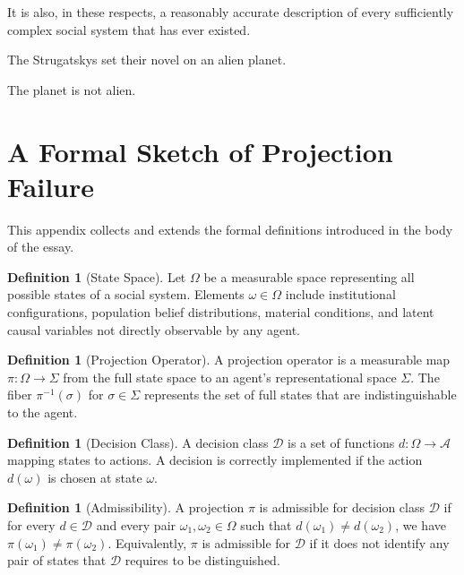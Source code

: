 \documentclass[12pt, a4paper]{article}
\theoremstyle{plain}
\theoremstyle{definition}
\newtheorem{definition}[theorem]{Definition}
\theoremstyle{remark}
\begin{document}
It is also, in these respects, a reasonably
accurate description of every sufficiently complex
social system that has ever existed.

The Strugatskys set their novel on an alien planet.

The planet is not alien.

\newpage
\appendix

\section{A Formal Sketch of Projection Failure}

This appendix collects and extends the formal
definitions introduced in the body of the essay.

\begin{definition}[State Space]
Let $\Omega$ be a measurable space representing
all possible states of a social system. Elements
$\omega \in \Omega$ include institutional
configurations, population belief distributions,
material conditions, and latent causal variables
not directly observable by any agent.
\end{definition}

\begin{definition}[Projection Operator]
A projection operator is a measurable map
$\pi: \Omega \to \Sigma$ from the full state
space to an agent's representational space
$\Sigma$. The fiber $\pi^{-1}(\sigma)$ for
$\sigma \in \Sigma$ represents the set of full
states that are indistinguishable to the agent.
\end{definition}

\begin{definition}[Decision Class]
A decision class $\mathcal{D}$ is a set of
functions $d: \Omega \to \mathcal{A}$ mapping
states to actions. A decision is correctly
implemented if the action $d(\omega)$ is chosen
at state $\omega$.
\end{definition}

\begin{definition}[Admissibility]
A projection $\pi$ is admissible for decision
class $\mathcal{D}$ if for every $d \in \mathcal{D}$
and every pair $\omega_1, \omega_2 \in \Omega$
such that $d(\omega_1) \neq d(\omega_2)$, we
have $\pi(\omega_1) \neq \pi(\omega_2)$.
Equivalently, $\pi$ is admissible for $\mathcal{D}$
if it does not identify any pair of states that
$\mathcal{D}$ requires to be distinguished.
\end{definition}
\end{document}
